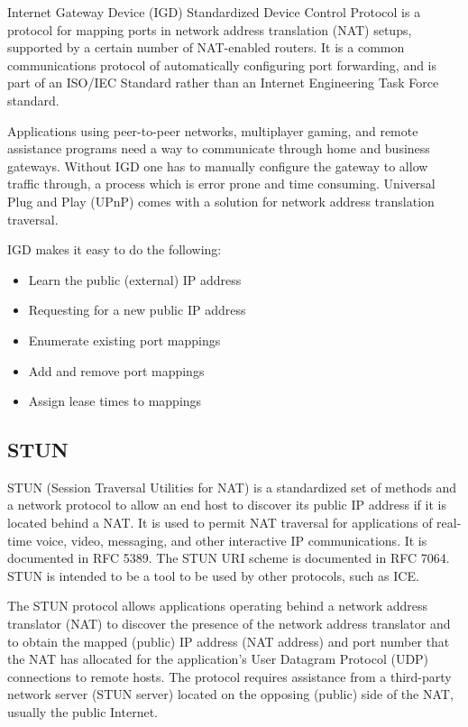 Internet Gateway Device (IGD) Standardized Device Control Protocol is a protocol for mapping ports in network address translation (NAT) setups, supported by a certain number of NAT-enabled routers.\cite{wing2013p} It is a common communications protocol of automatically configuring port forwarding, and is part of an ISO/IEC Standard \cite{sherwin2009upnp} rather than an Internet Engineering Task Force standard.

Applications using peer-to-peer networks, multiplayer gaming, and remote assistance programs need a way to communicate through home and business gateways. Without IGD one has to manually configure the gateway to allow traffic through, a process which is error prone and time consuming. Universal Plug and Play (UPnP) comes with a solution for network address translation traversal.

IGD makes it easy to do the following:

\begin{itemize}
  \item Learn the public (external) IP address
  \item Requesting for a new public IP address\cite{srisuresh1999ip}
  \item Enumerate existing port mappings
  \item Add and remove port mappings
  \item Assign lease times to mappings
\end{itemize}
\subsection{STUN}
STUN (Session Traversal Utilities for NAT) is a standardized set of methods and a network protocol to allow an end host to discover its public IP address if it is located behind a NAT. It is used to permit NAT traversal for applications of real-time voice, video, messaging, and other interactive IP communications. It is documented in RFC 5389\cite{rosenberg2008rfc}. The STUN URI scheme is documented in RFC 7064. STUN is intended to be a tool to be used by other protocols, such as ICE.

The STUN protocol allows applications operating behind a network address translator (NAT) to discover the presence of the network address translator and to obtain the mapped (public) IP address (NAT address) and port number that the NAT has allocated for the application's User Datagram Protocol (UDP) connections to remote hosts. The protocol requires assistance from a third-party network server (STUN server) located on the opposing (public) side of the NAT, usually the public Internet.


